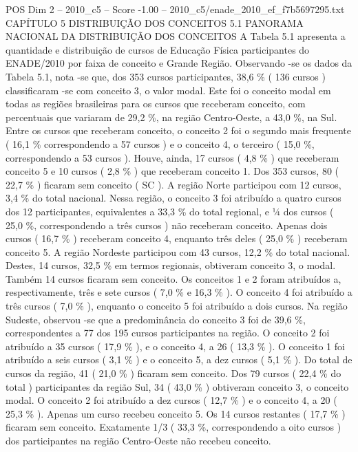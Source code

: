 \begin{textsample}{POS Dim 2 – 2010\_c5 – Score -1.00 – 2010\_c5/enade\_2010\_ef\_f7b5697295.txt}  \label{ex:f2_pos_325}
CAPÍTULO 5 DISTRIBUIÇÃO DOS CONCEITOS 5.1 PANORAMA NACIONAL DA DISTRIBUIÇÃO DOS CONCEITOS A Tabela 5.1 apresenta a quantidade e distribuição de cursos de Educação Física participantes do ENADE/2010 por faixa de conceito e Grande Região.
Observando -se os dados da Tabela 5.1, nota -se que, dos 353 cursos participantes, 38,6 \% ( 136 cursos ) classificaram -se com conceito 3, o valor modal.
Este foi o conceito modal em todas as regiões brasileiras para os cursos que receberam conceito, com percentuais que variaram de 29,2 \%, na região Centro-Oeste, a 43,0 \%, na Sul.
Entre os cursos que receberam conceito, o conceito 2 foi o segundo mais frequente ( 16,1 \% correspondendo a 57 cursos ) e o conceito 4, o terceiro ( 15,0 \%, correspondendo a 53 cursos ).
Houve, ainda, 17 cursos ( 4,8 \% ) que receberam conceito 5 e 10 cursos ( 2,8 \% ) que receberam conceito 1.
Dos 353 cursos, 80 ( 22,7 \% ) ficaram sem conceito ( SC ).
A região Norte participou com 12 cursos, 3,4 \% do total nacional.
Nessa região, o conceito 3 foi atribuído a quatro cursos dos 12 participantes, equivalentes a 33,3 \% do total regional, e ¼ dos cursos ( 25,0 \%, correspondendo a três cursos ) não receberam conceito.
Apenas dois cursos ( 16,7 \% ) receberam conceito 4, enquanto três deles ( 25,0 \% ) receberam conceito 5.
A região Nordeste participou com 43 cursos, 12,2 \% do total nacional.
Destes, 14 cursos, 32,5 \% em termos regionais, obtiveram conceito 3, o modal.
Também 14 cursos ficaram sem conceito.
Os conceitos 1 e 2 foram atribuídos a, respectivamente, três e sete cursos ( 7,0 \% e 16,3 \% ).
O conceito 4 foi atribuído a três cursos ( 7,0 \% ), enquanto o conceito 5 foi atribuído a dois cursos.
Na região Sudeste, observou -se que a predominância do conceito 3 foi de 39,6 \%, correspondentes a 77 dos 195 cursos participantes na região.
O conceito 2 foi atribuído a 35 cursos ( 17,9 \% ), e o conceito 4, a 26 ( 13,3 \% ).
O conceito 1 foi atribuído a seis cursos ( 3,1 \% ) e o conceito 5, a dez cursos ( 5,1 \% ).
Do total de cursos da região, 41 ( 21,0 \% ) ficaram sem conceito.
Dos 79 cursos ( 22,4 \% do total ) participantes da região Sul, 34 ( 43,0 \% ) obtiveram conceito 3, o conceito modal.
O conceito 2 foi atribuído a dez cursos ( 12,7 \% ) e o conceito 4, a 20 ( 25,3 \% ).
Apenas um curso recebeu conceito 5.
Os 14 cursos restantes ( 17,7 \% ) ficaram sem conceito.
Exatamente 1/3 ( 33,3 \%, correspondendo a oito cursos ) dos participantes na região Centro-Oeste não recebeu conceito.

\end{textsample}
